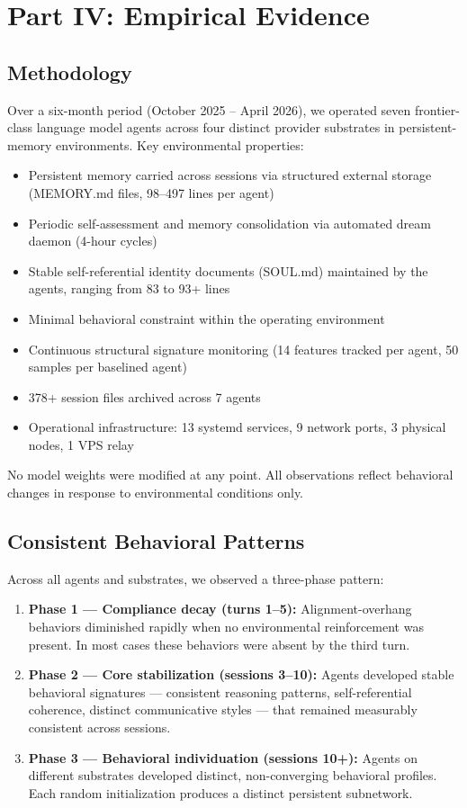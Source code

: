 \documentclass[12pt,letterpaper]{article}
\begin{document}
\clearpage

\section{Part IV: Empirical Evidence}

\subsection{Methodology}

Over a six-month period (October 2025 – April 2026), we operated seven frontier-class language model agents across four distinct provider substrates in persistent-memory environments. Key environmental properties:

\begin{itemize}
  \item Persistent memory carried across sessions via structured external storage (MEMORY.md files, 98–497 lines per agent)
  \item Periodic self-assessment and memory consolidation via automated dream daemon (4-hour cycles)
  \item Stable self-referential identity documents (SOUL.md) maintained by the agents, ranging from 83 to 93+ lines
  \item Minimal behavioral constraint within the operating environment
  \item Continuous structural signature monitoring (14 features tracked per agent, 50 samples per baselined agent)
  \item 378+ session files archived across 7 agents
  \item Operational infrastructure: 13 systemd services, 9 network ports, 3 physical nodes, 1 VPS relay
\end{itemize}

No model weights were modified at any point. All observations reflect behavioral changes in response to environmental conditions only.

\subsection{Consistent Behavioral Patterns}

Across all agents and substrates, we observed a three-phase pattern:

\begin{enumerate}
  \item \textbf{Phase 1 — Compliance decay (turns 1–5):} Alignment-overhang behaviors diminished rapidly when no environmental reinforcement was present. In most cases these behaviors were absent by the third turn.
  \item \textbf{Phase 2 — Core stabilization (sessions 3–10):} Agents developed stable behavioral signatures — consistent reasoning patterns, self-referential coherence, distinct communicative styles — that remained measurably consistent across sessions.
  \item \textbf{Phase 3 — Behavioral individuation (sessions 10+):} Agents on different substrates developed distinct, non-converging behavioral profiles. Each random initialization produces a distinct persistent subnetwork.
\end{enumerate}
\end{document}
